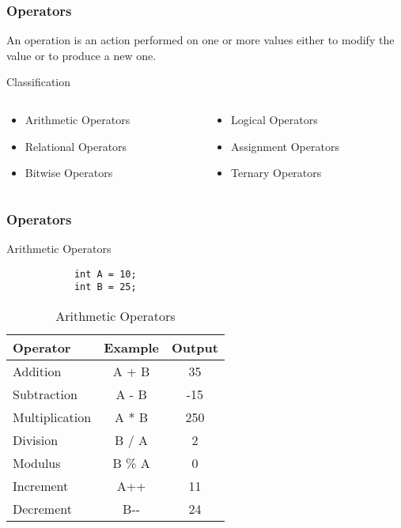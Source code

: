 \documentclass[10pt, compress]{beamer}
\begin{document}
\begin{frame}[fragile]
	\frametitle{Operators}
	An operation is an action performed on one or more values either to modify the value or to produce a new one.
	\begin{block}{Classification}
		\begin{columns}
			\begin{column}{0.5\textwidth}
				\begin{itemize}
					\item[] Arithmetic Operators
					\item[] Relational Operators
					\item[] Bitwise Operators
				\end{itemize}
			\end{column}
			\begin{column}{0.5\textwidth}
				\begin{itemize}
					\item[] Logical Operators
					\item[] Assignment Operators
					\item[] Ternary Operators
				\end{itemize}
			\end{column}
		\end{columns}
	\end{block}
\end{frame}

\begin{frame}[fragile]
	\frametitle{Operators}
	\begin{block}{Arithmetic Operators}
		\begin{verbatim}
			int A = 10;
			int B = 25;
		\end{verbatim}
		\begin{table}
			\begin{tabular}{lcc}
				\toprule
				Operator & Example & Output\\
				\midrule
				Addition & A + B & 35 \\
				Subtraction & A - B & -15\\
				Multiplication & A * B & 250\\
				Division & B / A & 2\\
				Modulus & B \% A & 0\\
				Increment & A++ & 11\\
				Decrement & B-{}- & 24\\
				\bottomrule
			\end{tabular}
			\caption{Arithmetic Operators}
		\end{table}
	\end{block}
\end{frame}
\end{document}
